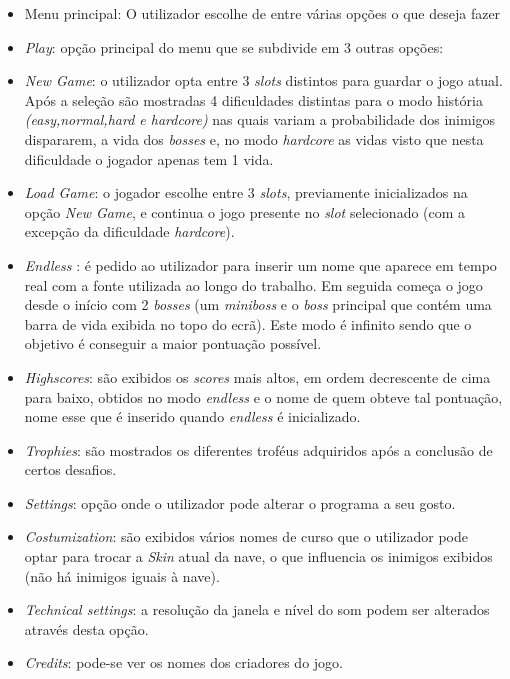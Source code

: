 \documentclass[a4paper,11pt]{article}
\newcommand\tabitem{\setlength{\itemindent}{1cm}}
\begin{document}
\begin{itemize}
    \item Menu principal: O utilizador escolhe de entre várias opções o que deseja fazer
    \tabitem
    \item \textit{Play}: opção principal do menu que se subdivide em 3 outras opções:
    \item \textit{New Game}: o utilizador opta entre 3 \textit{slots} distintos para guardar o jogo atual. Após a seleção são mostradas 4 dificuldades distintas para o modo história\textit{ (easy,normal,hard e hardcore)} nas quais variam a probabilidade dos inimigos dispararem, a vida dos \textit{bosses} e, no modo \textit{hardcore} as vidas visto que nesta dificuldade o jogador apenas tem 1 vida.

    \item \textit{Load Game}: o jogador escolhe entre 3 \textit{slots}, previamente inicializados na opção \textit{New Game}, e continua o jogo presente no \textit{slot} selecionado (com a excepção da dificuldade \textit{hardcore}).

    \item   \textit{Endless} : é pedido ao utilizador para inserir um nome que aparece em tempo real com a fonte utilizada ao longo do trabalho. Em seguida começa o jogo desde o início com 2 \textit{bosses} (um \textit{miniboss} e o \textit{boss} principal que contém uma barra de vida exibida no topo do ecrã). Este modo é infinito sendo que o objetivo é conseguir a maior pontuação possível.

    \item  \textit{Highscores}: são exibidos os \textit{scores }mais altos, em ordem decrescente de cima para baixo, obtidos no modo \textit{endless} e o nome de quem obteve tal pontuação, nome esse que é inserido quando \textit{endless} é inicializado.
    
    \item \textit{Trophies}: são mostrados os diferentes troféus adquiridos após a conclusão de certos desafios. 

    \item \textit{Settings}: opção onde o utilizador pode alterar o programa a seu gosto.
    \item  \textit{Costumization}: são exibidos vários nomes de curso que o utilizador pode optar para trocar a \textit{Skin} atual da nave, o que influencia os inimigos exibidos (não há inimigos iguais à nave).
    \item  \textit{Technical settings}: a resolução da janela e nível do som podem ser alterados através desta opção.

    \item \textit{Credits}: pode-se ver os nomes dos criadores do jogo. 
    
\end{itemize}
	    
\end{document}
